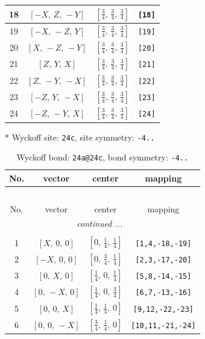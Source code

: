 \documentclass[fleqn,8pt]{jsarticle}
\begin{document}
\begin{longtable}{cccc}
18 & $\left[ - X,\, Z,\, - Y \right]$ & $\left[ \frac{3}{4},\, \frac{3}{4},\, \frac{3}{4} \right]$ & {\tt [18]} \\ \hline
19 & $\left[ - X,\, - Z,\, Y \right]$ & $\left[ \frac{3}{4},\, \frac{3}{4},\, \frac{3}{4} \right]$ & {\tt [19]} \\ \hline
20 & $\left[ X,\, - Z,\, - Y \right]$ & $\left[ \frac{3}{4},\, \frac{3}{4},\, \frac{3}{4} \right]$ & {\tt [20]} \\ \hline
21 & $\left[ Z,\, Y,\, X \right]$ & $\left[ \frac{3}{4},\, \frac{3}{4},\, \frac{3}{4} \right]$ & {\tt [21]} \\ \hline
22 & $\left[ Z,\, - Y,\, - X \right]$ & $\left[ \frac{3}{4},\, \frac{3}{4},\, \frac{3}{4} \right]$ & {\tt [22]} \\ \hline
23 & $\left[ - Z,\, Y,\, - X \right]$ & $\left[ \frac{3}{4},\, \frac{3}{4},\, \frac{3}{4} \right]$ & {\tt [23]} \\ \hline
24 & $\left[ - Z,\, - Y,\, X \right]$ & $\left[ \frac{3}{4},\, \frac{3}{4},\, \frac{3}{4} \right]$ & {\tt [24]} \\
\end{longtable}
* Wyckoff site: {\tt 24c}, site symmetry: {\tt -4..}
\renewcommand{\arraystretch}{1.2}
\begin{longtable}{cccc}
\caption{Wyckoff bond: {\tt 24a@24c}, bond symmetry: {\tt -4..}}
 \\
 \hline \hline
No. & vector & center & mapping \\ \hline \endfirsthead

\multicolumn{3}{l}{\tablename\ \thetable{}} \\
 \hline \hline
No. & vector & center & mapping \\ \hline \endhead

 \hline \hline
\multicolumn{3}{r}{\footnotesize\it continued ...} \\ \endfoot

 \hline \hline
\multicolumn{3}{r}{} \\ \endlastfoot

1 & $\left[ X,\, 0,\, 0 \right]$ & $\left[ 0,\, \frac{1}{4},\, \frac{1}{4} \right]$ & {\tt [1,4,-18,-19]} \\ \hline
2 & $\left[ - X,\, 0,\, 0 \right]$ & $\left[ 0,\, \frac{3}{4},\, \frac{1}{4} \right]$ & {\tt [2,3,-17,-20]} \\ \hline
3 & $\left[ 0,\, X,\, 0 \right]$ & $\left[ \frac{1}{4},\, 0,\, \frac{1}{4} \right]$ & {\tt [5,8,-14,-15]} \\ \hline
4 & $\left[ 0,\, - X,\, 0 \right]$ & $\left[ \frac{1}{4},\, 0,\, \frac{3}{4} \right]$ & {\tt [6,7,-13,-16]} \\ \hline
5 & $\left[ 0,\, 0,\, X \right]$ & $\left[ \frac{1}{4},\, \frac{1}{4},\, 0 \right]$ & {\tt [9,12,-22,-23]} \\ \hline
6 & $\left[ 0,\, 0,\, - X \right]$ & $\left[ \frac{3}{4},\, \frac{1}{4},\, 0 \right]$ & {\tt [10,11,-21,-24]} \\
\end{longtable}
\end{document}
